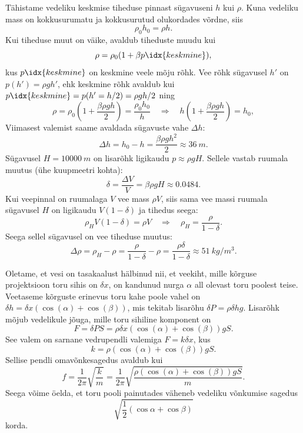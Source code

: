 \documentclass[10pt, twoside]{article}
\begin{document}
{%

\solu
\osa Tähistame vedeliku keskmise tiheduse pinnast sügavuseni $h$ kui $\rho$. Kuna vedeliku mass on kokkusurumatu ja kokkusurutud olukordades võrdne, siis
\[
\rho_{0} h_{0}=\rho h.
\]
Kui tiheduse muut on väike, avaldub tiheduste muudu kui
\[
\rho = \rho_0 (1 + \beta p\idx{keskmine}),
\]
kus $p\idx{keskmine}$ on keskmine veele mõju rõhk. Vee rõhk sügavusel $h'$ on $p(h') = \rho gh'$, ehk keskmine rõhk avaldub kui $p\idx{keskmine} = p(h' = h/2) = \rho gh/2$ ning
\[
\rho=\rho_{0}\left(1+\frac{\beta \rho g h}{2}\right)=\frac{\rho_{0} h_{0}}{h} \quad \Rightarrow \quad h\left(1+\frac{\beta \rho g h}{2}\right)=h_{0},
\]
Viimasest valemist saame avaldada sügavuste vahe $\Delta h$:
\[
\Delta h=h_{0}-h=\frac{\beta \rho g h^{2}}{2} \approx \SI{36}{m}.
\]
\osa Sügavusel $H = \SI{10000}{m}$ on lisarõhk ligikaudu $p \approx \rho gH$. Sellele vastab ruumala muutus (ühe kuupmeetri kohta): 
\[
\delta=\frac{\Delta V}{V}=\beta \rho g H \approx \num{0,0484}.
\]
Kui veepinnal on ruumalaga $V$ vee mass $\rho V$, siis sama vee massi ruumala sügavusel $H$ on ligikaudu $V (1 - \delta )$ ja tihedus seega:
\[
\rho_{H} V(1-\delta)=\rho V \quad \Rightarrow \quad \rho_{H}=\frac{\rho}{1-\delta}.
\]
Seega sellel sügavusel on vee tiheduse muutus: 
\[
\Delta \rho=\rho_{H}-\rho=\frac{\rho}{1-\delta}-\rho=\frac{\rho \delta}{1-\delta} \approx \SI{51}{kg/m^3}.
\]
\probend
\bigskip


\solu
Oletame, et vesi on tasakaalust hälbinud nii, et veekiht, mille kõrguse projektsioon toru sihis on $\delta x$, on kandunud nurga $\alpha$ all olevast toru poolest teise. Veetaseme kõrguste erinevus toru kahe poole vahel on $\delta h = \delta x (\cos (\alpha ) + \cos (\beta ))$, mis tekitab lisarõhu $\delta P = \rho \delta hg$. Lisarõhk mõjub vedelikule jõuga, mille toru sihiline komponent on
\[
F = \delta P S = \rho \delta x (\cos (\alpha ) + \cos (\beta )) gS.
\]
See valem on sarnane vedrupendli valemiga $F = k\delta x$, kus 
\[
k = \rho (\cos (\alpha ) + \cos (\beta )) gS.
\]
Sellise pendli omavõnkesagedus avaldub kui
\[
f = \frac{1}{2\pi} \sqrt{\frac{k}{m}} = \frac{1}{2\pi} \sqrt{\frac{\rho(\cos(\alpha)+\cos(\beta))gS}{m}}.
\]
Seega võime öelda, et toru pooli painutades väheneb vedeliku võnkumise sagedus
\[
\sqrt{\frac{1}{2}(\cos \alpha + \cos \beta)}
\]
korda.
\probend
\bigskip
\newpage
}
\end{document}
